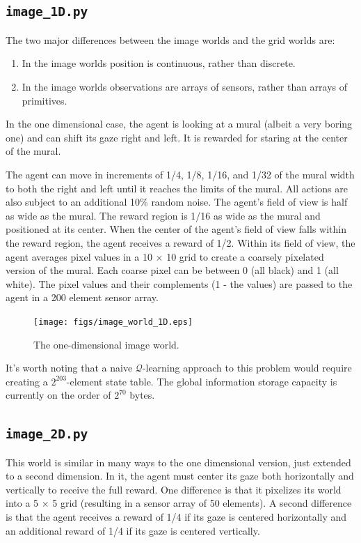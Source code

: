 \subsection{\texttt{image\_1D.py}}

The two major differences between the image worlds and the grid worlds are:

\begin{enumerate}
\item In the image worlds position is continuous, rather than discrete.
\item In the image worlds observations are arrays of sensors, rather than arrays of primitives.
\end{enumerate}

In the one dimensional case, the agent is looking at a mural (albeit a very boring one) and can shift its gaze right and left. It is rewarded for staring at the center of the mural.

The agent can move in increments of 1/4, 1/8, 1/16, and 1/32 of the mural width to both the right and left until it reaches the limits of the mural. All actions are also subject to an additional 10\% random noise. The agent's field of view is half as wide as the mural. The reward region is 1/16 as wide as the mural and positioned at its center. When the center of the agent's field of view falls within the reward region, the agent receives a reward of 1/2. Within its field of view, the agent averages pixel values in a 10 $\times$ 10 grid to create a coarsely pixelated version of the mural. Each coarse pixel can be between 0 (all black) and 1 (all white). The pixel values and their complements (1 - the values) are passed to the agent in a 200 element sensor array.

\begin{figure}
\centering
\texttt{[image: figs/image\_world\_1D.eps]}
\caption{The one-dimensional image world.}
\label{image_1D}
\end{figure}

It's worth noting that a naive $\mathcal{Q}$-learning approach to this problem would require creating a $2^203$-element state table. The global information storage capacity is currently on the order of $2^70$ bytes.

\subsection{\texttt{image\_2D.py}}

This world is similar in many ways to the one dimensional version, just extended to a second dimension. In it, the agent must center its gaze both horizontally and vertically to receive the full reward. One difference is that it pixelizes its world into a 5 $\times$ 5 grid (resulting in a sensor array of 50 elements). A second difference is that the agent receives a reward of 1/4 if its gaze is centered horizontally and an additional reward of 1/4 if its gaze is centered vertically. 

